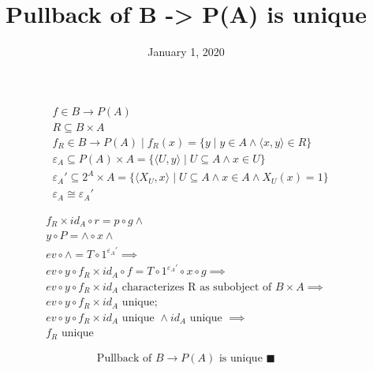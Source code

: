 \documentclass[11pt]{article}
\date{January 1, 2020}
\title{Pullback of B -> P(A) is unique}
\begin{document}
\begin{multicols}{2}

\columnbreak

\begin{equation*}
\begin{aligned}
& f \in B \rightarrow P(A) \\
& R \subseteq B \times A \\
& f_{R} \in B \rightarrow P(A) \mid f_{R}(x) = 
  \{y \mid y \in A \land \langle x, y \rangle \in R\} \\
& \varepsilon_{A} \subseteq P(A) \times A = 
  \{ \langle U, y \rangle \mid U \subseteq A \land x \in U \} \\
& \varepsilon_{A}' \subseteq 2^{A} \times A =
  \{ \langle X_{U}, x \rangle \mid 
      U \subseteq A \land x \in A \land X_{U}(x) = 1 \} \\
& \varepsilon_{A} \cong \varepsilon_{A}'
\end{aligned}
\end{equation*}

\end{multicols}

\begin{equation*}
\begin{aligned}
& f_{R} \times id_{A} \circ r = p \circ g \land \\
& y \circ P = \wedge \circ x \land \\
& ev \circ \wedge = T \circ 1^{\varepsilon_{A}'} \implies \\
& ev \circ y \circ f_{R} \times id_{A} \circ f =
  T \circ 1^{\varepsilon_{A}'} \circ x \circ g \implies \\
& ev \circ y \circ f_{R} \times id_{A} 
  \text{ characterizes R as subobject of } B \times A \implies \\
& ev \circ y \circ f_{R} \times id_{A} \text{ unique};
& \\
& ev \circ y \circ f_{R} \times id_{A} \text{ unique } \land
  id_{A} \text{ unique } \implies \\
& f_{R} \text{ unique}
\end{aligned}
\end{equation*}

\hrulefill

$$ \text{Pullback of } B \rightarrow P(A) \text{ is unique }\blacksquare $$
\end{document}
